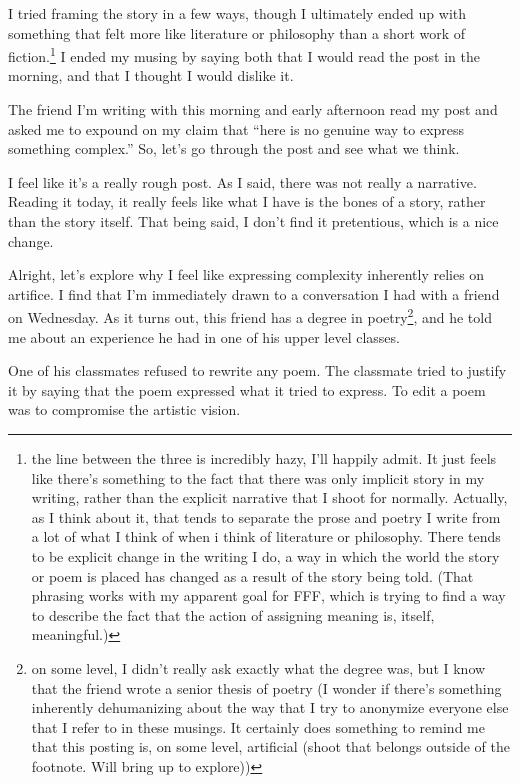 \documentclass[12pt]{article}[titlepage]
\newcommand{\say}[1]{``#1''}
\newcommand{\1}{\={a}}
\newcommand{\2}{\={e}}
\newcommand{\3}{\={\i}}
\newcommand{\4}{\=o}
\newcommand{\5}{\=u}
\newcommand{\6}{\={A}}
\renewcommand{\,}{\textsuperscript{,}}
\begin{document}
I tried framing the story in a few ways, though I ultimately ended up with something that felt more like literature or philosophy than a short work of fiction.\footnote{the line between the three is incredibly hazy, I'll happily admit.
It just feels like there's something to the fact that there was only implicit story in my writing, rather than the explicit narrative that I shoot for normally.
Actually, as I think about it, that tends to separate the prose and poetry I write from a lot of what I think of when i think of literature or philosophy.
There tends to be explicit change in the writing I do, a way in which the world the story or poem is placed has changed as a result of the story being told.
(That phrasing works with my apparent goal for FFF, which is trying to find a way to describe the fact that the action of assigning meaning is, itself, meaningful.)}
I ended my musing by saying both that I would read the post in the morning, and that I thought I would dislike it.

The friend I'm writing with this morning and early afternoon read my post and asked me to expound on my claim that \say{here is no genuine way to express something complex.}
So, let's go through the post and see what we think.

I feel like it's a really rough post.
As I said, there was not really a narrative.
Reading it today, it really feels like what I have is the bones of a story, rather than the story itself.
That being said, I don't find it pretentious, which is a nice change.

Alright, let's explore why I feel like expressing complexity inherently relies on artifice.
I find that I'm immediately drawn to a conversation I had with a friend on Wednesday.
As it turns out, this friend has a degree in poetry\footnote{on some level, I didn't really ask exactly what the degree was, but I know that the friend wrote a senior thesis of poetry (I wonder if there's something inherently dehumanizing about the way that I try to anonymize everyone else that I refer to in these musings.
It certainly does something to remind me that this posting is, on some level, artificial (shoot that belongs outside of the footnote. Will bring up to explore))}, and he told me about an experience he had in one of his upper level classes.

One of his classmates refused to rewrite any poem.
The classmate tried to justify it by saying that the poem expressed what it tried to express.
To edit a poem was to compromise the artistic vision.
\end{document}
